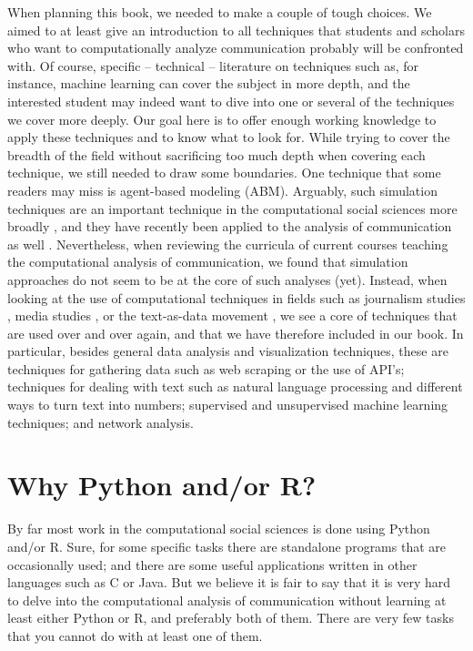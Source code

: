 When planning this book, we needed to make a couple of tough
choices. We aimed to at least give an introduction to all techniques
that students and scholars who want to computationally analyze
communication probably will be confronted with. Of course, specific --
technical -- literature on techniques such as, for instance, machine
learning can cover the subject in more depth, and the interested student may indeed
want to dive into one or several of the techniques we cover more
deeply. Our goal here is to offer enough working knowledge to apply
these techniques and to know what to look for.  While trying to cover
the breadth of the field without sacrificing too much depth when
covering each technique, we still needed to draw some boundaries. One
technique that some readers may miss is agent-based modeling
(ABM). Arguably, such simulation techniques are an important technique
in the computational social sciences more broadly
\citep{cioffi-revilla2014}, and they have recently been applied to the
analysis of communication as well
\citep{Waldherr2014,Wettstein2020}. Nevertheless, when reviewing the
curricula of current courses teaching the computational analysis of
communication, we found that simulation approaches do not seem to be at the core of
such analyses (yet).  Instead, when looking at the use of computational
techniques in fields such as journalism studies
\citep[e.g.,][]{Boumans2016}, media studies \citep[e.g.,][]{Rieder2017}, or
the text-as-data movement \citep{Grimmer2013}, we see a core of
techniques that are used  over and over again, and that we have therefore
included in our book. In particular, besides general data analysis and visualization techniques,
these are techniques for
gathering data such as web scraping or the use of API's; techniques
for dealing with text such as natural language processing and
different ways to turn text into numbers; supervised and unsupervised
machine learning techniques; and network analysis.

%


\section{Why Python and/or R?}\label{sec:whypythonr}
By far most work in the computational social sciences is done using
Python and/or R. Sure, for some specific tasks there are standalone
programs that are occasionally used; and there are some useful applications
written in other languages such as C or Java. But we believe it is
fair to say that it is very hard to delve into the computational analysis
of communication without learning at least either Python or R, and
preferably  both of them.
There are very few tasks that you cannot do with at least one of them.

